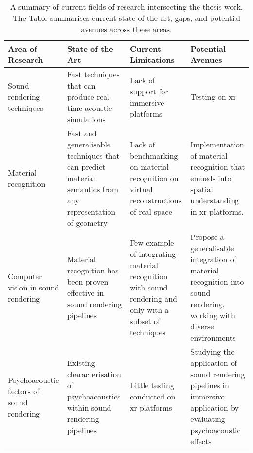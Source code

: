 {
\renewcommand{\arraystretch}{1.5}
\begin{table}[htbp]
    \centering
    \caption{A summary of current fields of research intersecting the thesis work. The Table summarises current state-of-the-art, gaps, and potential avenues across these areas.}
    \label{tab:lit-review-summary}
    \begin{tabularx}{\linewidth}{YYYY}
    \toprule
    Area of Research & State of the Art & Current Limitations & Potential Avenues \\ \midrule
    Sound rendering techniques & Fast techniques that can produce real-time acoustic simulations & Lack of support for immersive platforms & Testing on \acrshort{xr}  \\
    Material recognition & Fast and generalisable techniques that can predict material semantics   from any representation of geometry &
      Lack of benchmarking on material recognition on virtual reconstructions   of real space &
      Implementation of material recognition that embeds into spatial   understanding in \acrshort{xr} platforms. \\
    Computer vision in sound rendering &
      Material recognition has been proven effective in sound rendering   pipelines &
      Few example of integrating material recognition with sound rendering and   only with a subset of techniques &
      Propose a generalisable integration of material recognition into sound   rendering, working with diverse environments \\
    Psychoacoustic factors of sound rendering &
      Existing characterisation of psychoacoustics within sound rendering   pipelines &
      Little testing conducted on \acrshort{xr} platforms &
      Studying the application of sound rendering pipelines in immersive   application by evaluating psychoacoustic effects \\ \bottomrule
    \end{tabularx}
\end{table}

}
